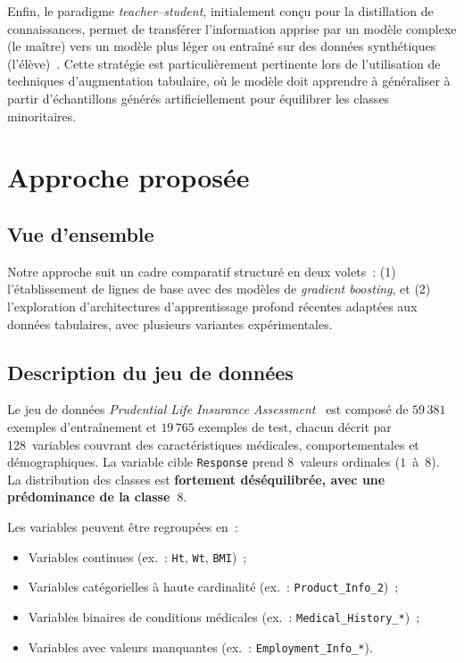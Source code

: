 \documentclass[conference]{IEEEtran}
\begin{document}
Enfin, le paradigme \textit{teacher--student}, initialement conçu pour la distillation de connaissances, permet de transférer l'information apprise par un modèle complexe (le maître) vers un modèle plus léger ou entraîné sur des données synthétiques (l'élève)~\cite{hinton2015distilling}. Cette stratégie est particulièrement pertinente lors de l'utilisation de techniques d'augmentation tabulaire, où le modèle doit apprendre à généraliser à partir d'échantillons générés artificiellement pour équilibrer les classes minoritaires.


\section{Approche proposée}
\label{sec:approche}

\subsection{Vue d'ensemble}

Notre approche suit un cadre comparatif structuré en deux volets~: (1) l'établissement de lignes de base avec des modèles de \textit{gradient boosting}, et (2) l'exploration d'architectures d'apprentissage profond récentes adaptées aux données tabulaires, avec plusieurs variantes expérimentales.

\subsection{Description du jeu de données}

Le jeu de données \textit{Prudential Life Insurance Assessment}~\cite{kaggle_prudential} est composé de \textbf{$59\,381$} exemples d'entraînement et \textbf{$19\,765$} exemples de test, chacun décrit par 128~variables couvrant des caractéristiques médicales, comportementales et démographiques. La variable cible \texttt{Response} prend $8$~valeurs ordinales ($1$~à~$8$). La distribution des classes est \textbf{fortement déséquilibrée, avec une prédominance de la classe~$8$}.

Les variables peuvent être regroupées en~:
\begin{itemize}
  \item Variables continues (ex.~: \texttt{Ht}, \texttt{Wt}, \texttt{BMI})~;
  \item Variables catégorielles à haute cardinalité (ex.~: \texttt{Product\_Info\_2})~;
  \item Variables binaires de conditions médicales (ex.~: \texttt{Medical\_History\_*})~;
  \item Variables avec valeurs manquantes (ex.~: \texttt{Employment\_Info\_*}).
\end{itemize}
\end{document}
